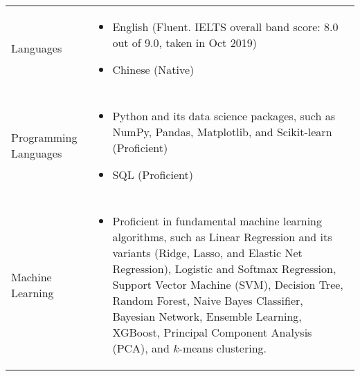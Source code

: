 \documentclass[10pt, oneside]{article}
\begin{document}
\begin{tabularx}{\linewidth}{p{2.2cm}|p{16cm}}
	\toprule 
	Languages
	& \begin{itemize}
		\item English (Fluent. IELTS overall band score: 8.0 out of 9.0, taken in Oct 2019)
		\item Chinese (Native)
	\end{itemize}
	\\\\
	Programming Languages
	& \begin{itemize}
		\item Python and its data science packages, such as NumPy, Pandas, Matplotlib, and Scikit-learn (Proficient)
		\item SQL (Proficient)
	\end{itemize}
	\\\\
	Machine Learning
	& \begin{itemize}
		\item Proficient in fundamental machine learning algorithms, such as Linear 
		Regression and its variants (Ridge, Lasso, and Elastic Net Regression), Logistic and Softmax Regression, Support Vector Machine (SVM), Decision Tree, Random Forest, Naive Bayes Classifier, Bayesian Network, Ensemble Learning, XGBoost, Principal Component Analysis (PCA), and $k$-means clustering.
	\end{itemize}
\end{tabularx}
\end{document}
